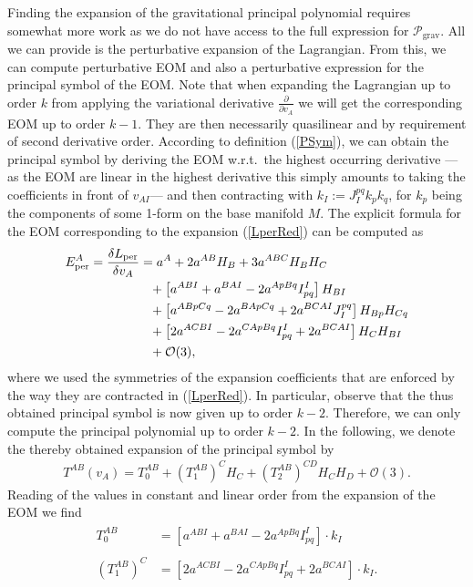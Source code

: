 Finding the expansion of the gravitational principal polynomial requires somewhat more work as we do not have access to the full expression for $\mathcal{P}_{\text{grav}}$. All we can provide is the perturbative expansion of the Lagrangian. From this, we can compute perturbative EOM and also a perturbative expression for the principal symbol of the EOM.
Note that when expanding the Lagrangian up to order $k$ from applying the variational derivative $\frac{\partial}{\partial v_A}$ we will get the corresponding EOM up to order $k-1$. They are then necessarily quasilinear and by requirement of second derivative order. According to definition (\ref{PSym}), we can obtain the principal symbol by deriving the EOM w.r.t.\ the highest occurring derivative  ---as the EOM are linear in the highest derivative this simply amounts to taking the coefficients in front of $v_{AI}$--- and then contracting with $k_I :=J_I^{pq} k_pk_q$, for $k_p$ being the components of some 1-form on the base manifold $M$. 
The explicit formula for the EOM corresponding to the expansion (\ref{LperRed}) can be computed as
\begin{align}\label{EOMPert}
    \begin{aligned}
    E_{\text{per}}^A = \frac{\delta L_{\text{per}}}{\delta v_A} &= a^A + 2 a^{AB}H_B + 3a^{ABC}H_B H_C \\
    &\hphantom{=}+ \left [a^{ABI} + a^{BAI} - 2 a^{ApBq}I_{pq}^I  \right ] H_{BI} \\
    &\hphantom{=}+ \left[a^{ABpCq} -2a^{BApCq} +2a^{BCAI} J_I^{pq} \right]H_{Bp}H_{Cq} \\
    &\hphantom{=}+ \left [2a^{ACBI} -2a^{CApBq}I_{pq}^I + 2a^{BCAI} \right ]H_C H_{BI} \\
    &\hphantom{=}+ \mathcal{O}(3),
    \end{aligned}
\end{align}
where we used the symmetries of the expansion coefficients that are enforced by the way they are contracted in (\ref{LperRed}).
In particular, observe that the thus obtained principal symbol is now given up to order $k-2$. Therefore, we can only compute the principal polynomial up to order $k-2$. In the following, we denote the thereby obtained expansion of the principal symbol by
\begin{align}
    T^{AB}(v_A) = T^{AB}_0 + (T^{AB}_1)^CH_C + (T^{AB}_2)^{CD}H_CH_D + \mathcal{O}(3).
\end{align}
Reading of the values in constant and linear order from the expansion of the EOM we find
\begin{align}
    \begin{aligned}
    T_0^{AB} &= \left [a^{ABI} + a^{BAI} - 2 a^{ApBq}I_{pq}^I  \right ] \cdot k_I\\
    \\
    (T_1^{AB})^C &= \left [2a^{ACBI} -2a^{CApBq}I_{pq}^I + 2a^{BCAI} \right ] \cdot k_I. 
    \end{aligned}
\end{align}
